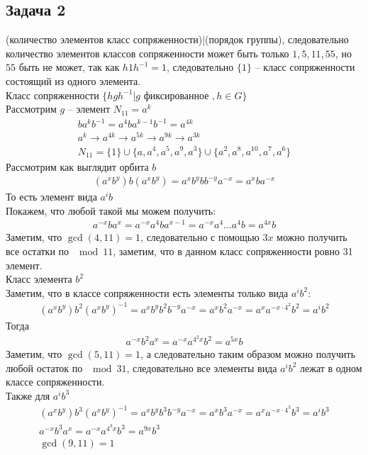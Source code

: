 \subsection*{Задача 2}
	(количество элементов класс сопряженности)|(порядок группы), следовательно количество элементов классов сопряженности может быть только $1,5,11,55$, но $55$ быть не может, так как $h 1 h^{-1} = 1$, следовательно $\{1\}$ -- класс сопряженности состоящий из одного элемента.\\
	Класс сопряженности $\{hgh^{-1}| g \text{ фиксированное }, h \in G\}$\\
	Рассмотрим $g$ -- элемент $N_{11} = a^k$
	\begin{gather*}
		b a^{k} b^{-1} = a^4 b a^{k-1} b^{-1} = a^{4k}\\
		a^{k} \to a^{4k} \to a^{5k} \to a^{9k} \to a^{3k}\\
		N_{11} = \{1\} \cup \{a, a^4, a^5, a^9, a^3\} \cup \{a^2, a^8, a^{10}, a^7, a^6\}
	\end{gather*}
	Рассмотрим как выглядит орбита $b$
	\begin{gather*}
		(a^x b^y) b (a^x b^y) = a^x b^y b b^{-y} a^{-x} = a^x b a^{-x}
	\end{gather*}
	То есть элемент вида $a^i b$\\
	Покажем, что любой такой мы можем получить:
	\begin{gather*}
		a^{-x} b a^{x} = a^{-x} a^{4} b a^{x-1} = a^{-x} a^{4} \ldots a^{4} b = a^{4x} b
	\end{gather*}
	Заметим, что $\operatorname{gcd}(4,11) = 1$, следовательно с помощью $3x$ можно получить все остатки по $\mod 11$, заметим, что в данном класс сопряженности ровно 31 элемент.\\
	Класс элемента $b^2$\\
	Заметим, что в классе сопряженности есть элементы только вида $a^i b^2$:
	\begin{gather*}
		(a^x b^y) b^2 (a^x b^y)^{-1} = a^x b^y b^2 b^{-y} a^{-x} = a^x b^2 a^{-x} = a^{x} a^{-x \cdot 4^2} b^2 = a^{i} b^2
	\end{gather*}
	Тогда
	\begin{gather*}
		a^{-x} b^2 a^{x} = a^{-x} a^{4^2 x} b^2 = a^{5x} b
	\end{gather*}
	Заметим, что $\operatorname{gcd}(5,11) = 1$, а следовательно таким образом можно получить любой остаток по $\mod 31$, следовательно все элементы вида $a^i b^2$ лежат в одном классе сопряженности.\\
	Также для $a^i b^3$
	\begin{gather*}
		(a^x b^y) b^3 (a^x b^y)^{-1} = a^x b^y b^3 b^{-y} a^{-x} = a^x b^3 a^{-x} = a^{x} a^{-x \cdot 4^3} b^3 = a^{i} b^3\\
		a^{-x} b^3 a^{x} = a^{-x} a^{4^3 x} b^3 = a^{9x} b^3\\
		\operatorname{gcd}(9,11)=1
	\end{gather*}
